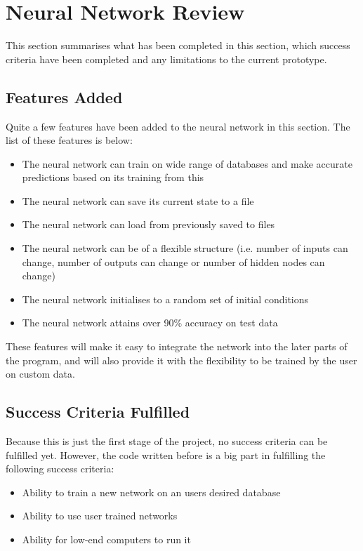 \documentclass{report}
\begin{document}
\section{Neural Network Review}
This section summarises what has been completed in this section, which success criteria have been completed and any limitations to the current prototype.
\subsection{Features Added}
Quite a few features have been added to the neural network in this section. The list of these features is below:
\begin{itemize}
    \item The neural network can train on wide range of databases and make accurate predictions based on its training from this
    \item The neural network can save its current state to a file
    \item The neural network can load from previously saved to files
    \item The neural network can be of a flexible structure (i.e. number of inputs can change, number of outputs can change or number of hidden nodes can change)
    \item The neural network initialises to a random set of initial conditions
    \item The neural network attains over 90\% accuracy on test data
\end{itemize}
These features will make it easy to integrate the network into the later parts of the program, and will also provide it with the flexibility to be trained by the user on custom data.
\subsection{Success Criteria Fulfilled}
Because this is just the first stage of the project, no success criteria can be fulfilled yet. However, the code written before is a big part in fulfilling the following success criteria:
\begin{itemize}
    \item Ability to train a new network on an users desired database
    \item Ability to use user trained networks
    \item Ability for low-end computers to run it
\end{itemize}
\end{document}

